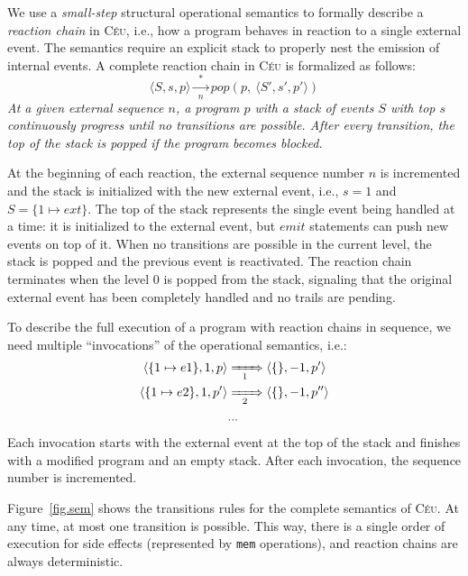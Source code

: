 \documentclass{acm_proc_article-sp}
\newcommand{\CEU}{\textsc{C\'{e}u}\xspace}
\newcommand{\code}[1] {{\small{\texttt{#1}}}}
\newcommand{\LL}{\langle}
\newcommand{\RR}{\rangle}
\newcommand{\1}{\;}
\newcommand{\2}{\;\;}
\newcommand{\3}{\;\;\;}
\newcommand{\5}{\;\;\;\;\;}
\begin{document}
We use a \emph{small-step} structural operational semantics to formally 
describe a \emph{reaction chain} in \CEU, i.e., how a program behaves in 
reaction to a single external event.
%
The semantics require an explicit stack to properly nest the emission of 
internal events.
%
A complete reaction chain in \CEU is formalized as follows:
%
$$
\LL S, s, p \RR
    \xrightarrow[~~n~~]{~~*~~}
pop(p,~\LL S', s', p' \RR)
$$
%
\emph{At a given external sequence $n$, a program $p$ with a stack of events 
$S$ with top $s$ continuously progress until no transitions are possible.
After every transition, the top of the stack is popped if the program becomes 
blocked.}

At the beginning of each reaction, the external sequence number $n$ is 
incremented and the stack is initialized with the new external event, i.e., 
$s=1$ and $S=\{ 1 \mapsto ext \}$.
%
%
The top of the stack represents the single event being handled at a time:
it is initialized to the external event, but $emit$ statements can push new 
events on top of it.
When no transitions are possible in the current level, the stack is popped and 
the previous event is reactivated.
The reaction chain terminates when the level 0 is popped from the stack, 
signaling that the original external event has been completely handled and no 
trails are pending.

To describe the full execution of a program with reaction chains in sequence, 
we need multiple ``invocations'' of the operational semantics, i.e.:
%
\begin{align*}
\LL \{ 1 \mapsto e1 \}, 1, p \RR
    & \xRightarrow[~~1~~]{}
\LL \{\}, -1, p' \RR
\\
\LL \{ 1 \mapsto e2 \}, 1, p' \RR
    & \xRightarrow[~~2~~]{}
\LL \{\}, -1, p'' \RR
\\
& ...
\end{align*}
%
Each invocation starts with the external event at the top of the stack and 
finishes with a modified program and an empty stack.
After each invocation, the sequence number is incremented.

Figure~\ref{fig.sem} shows the transitions rules for the complete semantics of 
\CEU.
At any time, at most one transition is possible.
This way, there is a single order of execution for side effects (represented by 
\code{mem} operations), and reaction chains are always deterministic.
\end{document}
